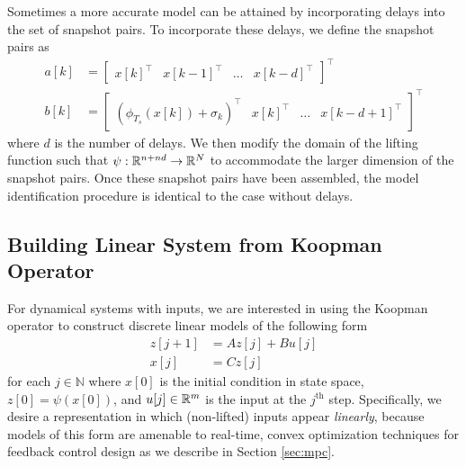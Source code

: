 Sometimes a more accurate model can be attained by incorporating delays into the set of snapshot pairs. 
To incorporate these delays, we define the snapshot pairs as
\begin{align}
    a[k] &= \begin{bmatrix} x[k]^\top & x[k-1]^\top & \ldots & x[k-d]^\top \end{bmatrix}^\top \label{eq:snapd1} \\
    b[k] &= \begin{bmatrix} \left( \phi_{T_s} (x[k]) + \sigma_k \right)^\top & x[k]^\top & \ldots & x[k-d+1]^\top \end{bmatrix}^\top \label{eq:snapd2}
\end{align}
where $d$ is the number of delays.
We then modify the domain of the lifting function such that $\psi : \mathbb{R}^{n+nd} \to \mathbb{R}^{N}$ to accommodate the larger dimension of the snapshot pairs.
Once these snapshot pairs have been assembled, the model identification procedure is identical to the case without delays.

\subsection{Building Linear System from Koopman Operator}

For dynamical systems with inputs, we are interested in using the Koopman operator to construct discrete linear models of the following form
\begin{equation}
\begin{aligned}
    z[j+1] &= A z[j] + B u[j] \\
    x[j] &= C z[j]
    \label{eq:linSys}
\end{aligned}
\end{equation}
 for each $j \in \mathbb{N}$ where $x[0]$ is the initial condition in state space, $z[0] = \psi(x[0])$, and $u[j] \in \mathbb{R}^m$ is the input at the $j^{\text{th}}$ step.
Specifically, we desire a representation in which (non-lifted) inputs appear \emph{linearly}, because models of this form are amenable to real-time, convex optimization techniques for feedback control design as we describe in Section \ref{sec:mpc}.

